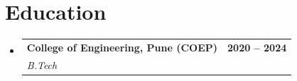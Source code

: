 \documentclass[letterpaper,10pt]{article}
\makeatletter
\newcommand{\resumeSubheading}[4]{
\item
\begin{tabular*}{\textwidth}{l@{\extracolsep{\fill}}r}
\textbf{#1} & \textbf{\small #2} \\
\textit{\small #3} & \textit{\small #4}
\end{tabular*}\vspace{-4pt}
}
\makeatother
\begin{document}
\section{Education}
\begin{itemize}[leftmargin=0pt, label={}]
\resumeSubheading
{College of Engineering, Pune (COEP)}{2020 -- 2024}
{B.Tech}{}
\end{itemize}
\end{document}
